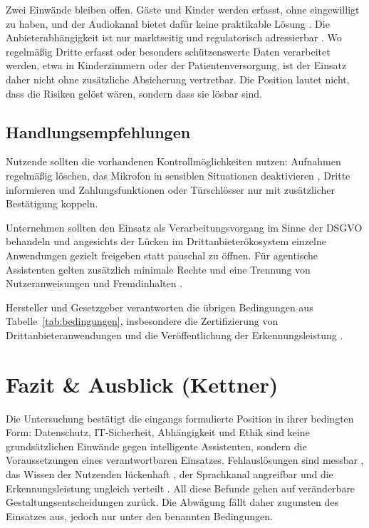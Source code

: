 Zwei Einwände bleiben offen. Gäste und Kinder werden erfasst, ohne eingewilligt zu haben, und der Audiokanal bietet dafür keine praktikable Lösung \cite{seymour2023consent}. Die Anbieterabhängigkeit ist nur marktseitig und regulatorisch adressierbar \cite{blancato2024cloud}. Wo regelmäßig Dritte erfasst oder besonders schützenswerte Daten verarbeitet werden, etwa in Kinderzimmern oder der Patientenversorgung, ist der Einsatz daher nicht ohne zusätzliche Absicherung vertretbar. Die Position lautet nicht, dass die Risiken gelöst wären, sondern dass sie lösbar sind.

\subsection{Handlungsempfehlungen}

Nutzende sollten die vorhandenen Kontrollmöglichkeiten nutzen: Aufnahmen regelmäßig löschen, das Mikrofon in sensiblen Situationen deaktivieren \cite{malkin2019privacy}, Dritte informieren und Zahlungsfunktionen oder Türschlösser nur mit zusätzlicher Bestätigung koppeln.

Unternehmen sollten den Einsatz als Verarbeitungsvorgang im Sinne der \ac{DSGVO} behandeln und angesichts der Lücken im Drittanbieterökosystem \cite{lentzsch2021alexa} einzelne Anwendungen gezielt freigeben statt pauschal zu öffnen. Für agentische Assistenten gelten zusätzlich minimale Rechte und eine Trennung von Nutzeranweisungen und Fremdinhalten \cite{greshake2023injection}.

Hersteller und Gesetzgeber verantworten die übrigen Bedingungen aus Tabelle~\ref{tab:bedingungen}, insbesondere die Zertifizierung von Drittanbieteranwendungen und die Veröffentlichung der Erkennungsleistung \cite{koenecke2020racial}.

\section{Fazit \& Ausblick (Kettner)}
\label{sec:fazit}

Die Untersuchung bestätigt die eingangs formulierte Position in ihrer bedingten Form: Datenschutz, IT-Sicherheit, Abhängigkeit und Ethik sind keine grundsätzlichen Einwände gegen intelligente Assistenten, sondern die Voraussetzungen eines verantwortbaren Einsatzes. Fehlauslösungen sind messbar \cite{schoenherr2022accidental}, das Wissen der Nutzenden lückenhaft \cite{malkin2019privacy}, der Sprachkanal angreifbar \cite{zhang2017dolphin,sugawara2020light} und die Erkennungsleistung ungleich verteilt \cite{koenecke2020racial}. All diese Befunde gehen auf veränderbare Gestaltungsentscheidungen zurück. Die Abwägung fällt daher zugunsten des Einsatzes aus, jedoch nur unter den benannten Bedingungen.

